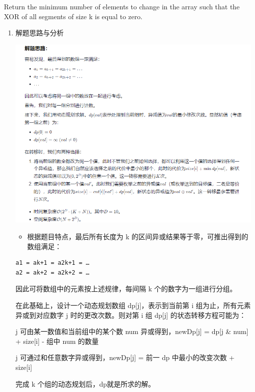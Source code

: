 \documentclass[9pt, b5paaper]{book}
\begin{document}
Return the minimum number of elements to change in the array such that the XOR of all segments of size k​​​​​​ is equal to zero.
\begin{enumerate}
\item 解题思路与分析
\label{sec-1-4-62-0-1}

\includegraphics[width=.9\linewidth]{./pic/xortimes.png}

\begin{itemize}
\item 根据题目特点，最后所有长度为 k 的区间异或结果等于零，可推出得到的数组满足：
\end{itemize}
\begin{verbatim}
a1 = ak+1 = a2k+1 = …
a2 = ak+2 = a2k+2 = …
\end{verbatim}
因此可将数组中的元素按上述规律，每间隔 k 个的数字为一组进行分组。

在此基础上，设计一个动态规划数组 dp[j]，表示到当前第 i 组为止，所有元素异或到对应数字 j 时的更改次数。则对第 i 组 dp[j] 的状态转移方程可能为：

j 可由某一数值和当前组中的某个数 num 异或得到，newDp[j] = dp[j \& num] + size[i] - 组中 num 的数量

j 可通过和任意数字异或得到，newDp[j] = 前一 dp 中最小的改变次数 + size[i]

完成 k 个组的动态规划后，dp\footnotemark[1]{}就是所求的解。


\end{enumerate}
\end{document}
